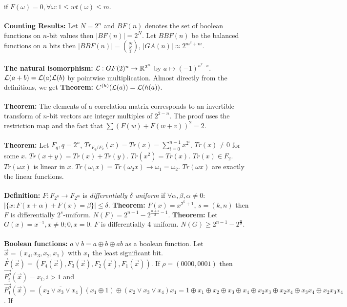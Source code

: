 if $F(\omega)=0, \forall \omega: 1 \le wt(\omega) \le m$. \\
\\
{\bf Counting Results:} Let $N=2^n$ and $BF(n)$ denotes the set of boolean functions on $n$-bit
values then $|BF(n)|= 2^N$. Let $BBF(n)$ be the balanced functions on $n$ bits then
$|BBF(n)|= {N \choose {\frac N 2}}$, $|GA(n)| \approx 2^{m^2+m}$.\\
\\
{\bf The natural isomorphism:}
${\cal L}: GF(2)^n \rightarrow {\mathbb R}^{2^n}$ by $a \mapsto (-1)^{a^T \cdot x}$.
${\cal L}(a+b)= {\cal L}(a) {\cal L}(b)$ by pointwise multiplication.  
Almost directly from the definitions, we get {\bf Theorem:}
$C^{(h)}({\cal L}(a))= {\cal L}(h(a))$.  
\\
\\
{\bf Theorem:} The elements of a correlation matrix corresponds to an invertible
transform of $n$-bit vectors are integer multiples of $2^{2-n}$.  The proof uses
the restriction map and the fact that $\sum (F(w) + F(w+v))^2 = 2$.
\\
\\
{\bf Theorem:} 
Let $F_q, q=2^n$, $Tr_{F_q/F_2}(x)=Tr(x)= \sum_{i=0}^{n-1} x^{2^i}$.
$Tr(x) \ne 0$ for some $x$.
$Tr(x+y)= Tr(x)+Tr(y)$.
$Tr(x^2)= Tr(x)$.
$Tr(x) \in F_2$.
$Tr(\omega x)$ is linear in $x$.
$Tr(\omega_1 x)= Tr(\omega_2 x) \rightarrow \omega_1 = \omega_2$.
$Tr(\omega x)$ are exactly the linear functions.
\\
\\
{\bf Definition:}
$F: F_{2^n} \rightarrow F_{2^m}$ is \emph{differentially $\delta$ uniform} if
$\forall \alpha, \beta, \alpha \ne 0$: $|\{ x: F(x+\alpha)+F(x)= \beta \}| \leq \delta$.
{\bf Theorem:} $F(x)= x^{2^k + 1}$, $s=(k,n)$ then $F$ is differentially $2^s$-uniform.
$N(F)= 2^{n-1} - 2^{{\frac {n+s} 2} -1}$.
{\bf Theorem:}  Let $G(x)= x^{-1}, x \ne 0; 0, x=0$.  $F$ is differentially 4 uniform.
$N(G) \geq 2^{n-1}-2^{{\frac n 2}}$.
\\
\\
{\bf Boolean functions:}
$a \vee b = a \oplus b \oplus ab$ as a boolean function.  Let ${\vec x}= (x_4 , x_3, x_2, x_1)$
with $x_1$ the least significant bit.
${\vec F} ({\vec x})=
(F_4 ({\vec x}), F_3 ({\vec x}), F_2 ({\vec x}), F_1 ({\vec x}))$.
If $\rho= (0000, 0001)$ then 
${\vec {F_i^{\rho}}}({\vec x})= x_i, i>1$ and 
${\vec {F_1^{\rho}}}({\vec x})= 
({\overline {x_2 \vee  x_3 \vee x_4}}) (x_1 \oplus 1) \oplus
(x_2 \vee x_3 \vee x_4) x_1= 1 \oplus x_1 \oplus x_2 \oplus x_3 \oplus x_4
\oplus x_2 x_3 \oplus x_2 x_4 \oplus x_3 x_4 \oplus x_2 x_3 x_4$.  If
